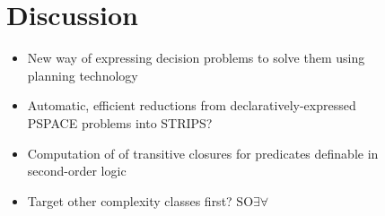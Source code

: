 \documentclass[portrait]{sciposter}
\newcommand{\SOEA}{\ensuremath{\text{SO}\exists\forall}}
\begin{document}
\begin{figure}[ht]
\begin{minipage}{0.666\linewidth}
\begin{multicols}{2}
\begin{table}[t]
\centering
{}
\end{table}

\section*{\large{Discussion}}
\begin{itemize}
    \item New way of expressing decision problems to solve them using planning technology
    \item Automatic, efficient reductions from declaratively-expressed PSPACE problems into STRIPS?
    \item Computation of of transitive closures for predicates definable in second-order logic
    \item Target other complexity classes first? \SOEA\
\end{itemize}

\end{multicols}

\end{minipage}
\hspace{2cm}
\begin{minipage}{0.333\linewidth}
\vspace{-1.5cm}

\end{minipage}
\end{figure}
\end{document}
